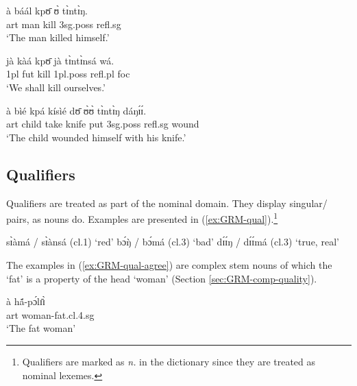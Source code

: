 \begin{exe}
\begin{exe}
\begin{exe}
\begin{exe}
\begin{exe}
\begin{exe}
\begin{exe}
\begin{exe}
\begin{exe}
   
  \z 
 \z



 \ea\label{ex:GRM-reflex}
  
   
\ea\label{ex:vp25.1.}
\gll  à báál kpʊ̄ ʊ̀ tɪ̀ntɪ̀ŋ.\\
   {\sc art} man kill  {\sc 3sg.poss} {\sc refl.sg}\\
\glt  `The man killed himself.' 

\ex\label{ex:vp25.2.}
\gll jà kàá kpʊ̄ jà tɪ̀ntɪ̀nsá wá.\\
  {\sc 1pl}  {\sc fut} kill {\sc 1pl.poss}  {\sc refl.pl} {\sc foc}\\
\glt  `We shall kill {\sc ourselves}.'

\ex\label{ex:vp25.4.}
\gll à bìé kpá kísìé dʊ̄ ʊ̀ʊ̀ tɪ̀ntɪ̀ŋ dáŋɪ́ɪ́.\\
    {\sc art} child take knife put  {\sc 3sg.poss}   {\sc
refl.sg} wound\\
\glt  `The child wounded himself with his knife.' 
  
   
  \z 
 \z




\subsection{Qualifiers}
\label{sec:GRM-qualifier}

Qualifiers are treated  as part of the nominal domain. They display singular/ pairs, as  nouns do. Examples are presented in (\ref{ex:GRM-qual}).\footnote{Qualifiers are marked as {\it n.} in the dictionary since they are treated as nominal lexemes.}

\ea\label{ex:GRM-qual}
 
  \ea\label{ex:GRM-qual-red}
sɪ̀àmá {\rm /} sɪ̀ànsá   {\rm ({\sc cl.}1) `red'}
  \ex\label{ex:GRM-qual-bad}
 bɔ́ŋ̀ {\rm /}  bɔ́má   {\rm  ({\sc cl.}3)  `bad'}
  \ex\label{ex:GRM-qual-real}
dɪ́ɪ́ŋ {\rm /} dɪ́ɪ́má  {\rm  ({\sc cl.}3) `true, real'}

\z 
 \z


The examples in (\ref{ex:GRM-qual-agree}) are complex stem nouns  of which the   `fat'  is 
a property of   the head `woman'  (Section \ref{sec:GRM-comp-quality}).

\ea\label{ex:GRM-qual-agree}

  \ea\label{ex:GRM-qual-agree-sg}
\gll à  hã́-pɔ́lɪ̄ɪ̀\\
{\sc art} woman-fat.{\sc cl.4.sg}\\
\glt `The fat woman' 


\end{exe}
\end{exe}
\end{exe}
\end{exe}
\end{exe}
\end{exe}
\end{exe}
\end{exe}
\end{exe}
